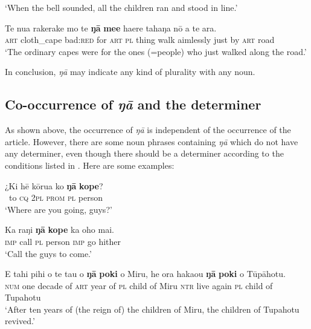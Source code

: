 \glt 
‘When the bell sounded, all the children ran and stood in line.’ \textstyleExampleref{[R334.012]} 
\z

\ea\label{ex:5.87}
\gll Te nua rakerake mo te \textbf{ŋā} \textbf{me{\ꞌ}e} ha{\ꞌ}ere tahaŋa nō a te ara. \\
\textsc{art} cloth\_cape bad:\textsc{red} for \textsc{art} \textsc{pl} thing walk aimlessly just by \textsc{art} road \\

\glt
‘The ordinary capes were for the ones (=people) who just walked along the road.’ \textstyleExampleref{[Ley-5-04.012]}
\z

In conclusion, \textit{ŋā} may indicate any kind of plurality with any noun.

\subsection{Co-occurrence of \textit{ŋā} and the determiner}\label{sec:5.5.2}

As shown above, the occurrence of \textit{ŋā} is independent of the occurrence of the article. However, there are some noun phrases containing \textit{ŋā} which do not have any determiner, even though there should be a determiner according to the conditions listed in . Here are some examples:

\ea\label{ex:5.88}
\gll ¿Ki hē kōrua ko \textbf{ŋā} \textbf{kope}? \\
~to \textsc{cq} \textsc{2pl} \textsc{prom} \textsc{pl} person \\

\glt 
‘Where are you going, guys?’ \textstyleExampleref{[Ley-4-05.066]}
\z

\ea\label{ex:5.89}
\gll Ka raŋi \textbf{ŋā} \textbf{kope} ka oho mai. \\
\textsc{imp} call \textsc{pl} person \textsc{imp} go hither \\

\glt 
‘Call the guys to come.’ \textstyleExampleref{[R232.058]} 
\z

\ea\label{ex:5.90}
\gll E tahi pihi o te ta{\ꞌ}u o \textbf{ŋā} \textbf{poki} o Miru, he ora haka{\ꞌ}ou  \textbf{ŋā} \textbf{poki} o Tūpāhotu.\\
\textsc{num} one decade of \textsc{art} year of \textsc{pl} child of Miru \textsc{ntr} live again  \textsc{pl} child of Tupahotu\\

\glt 
‘After ten years of (the reign of) the children of Miru, the children of Tupahotu revived.’ \textstyleExampleref{[Mtx-3-07.016]}
\z

